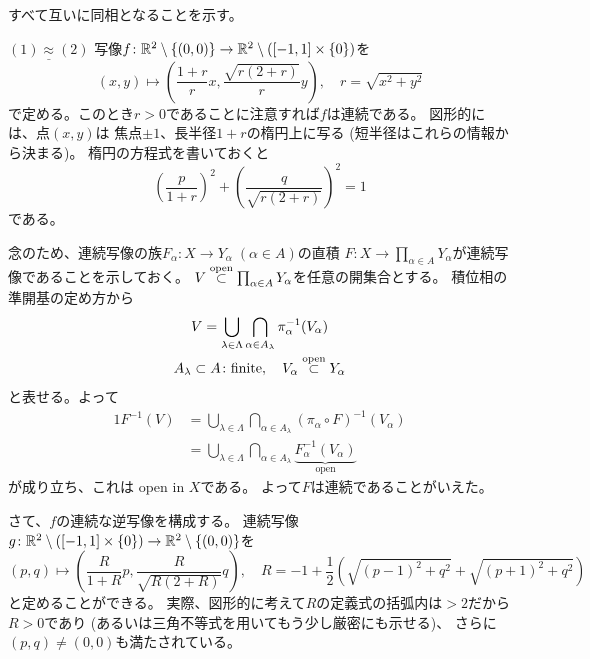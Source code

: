 \documentclass[report]{jlreq}
\begin{document}
\begin{answer}
    すべて互いに同相となることを示す。

    $\underline{(1) \approx (2)}$\quad
    写像$f \colon \mathbb{R}^2 \setminus \{(0, 0)\} \to \mathbb{R}^2 \setminus ([-1, 1] \times \{0\})$を
    \begin{equation}
        (x, y) \mapsto \left(\frac{1 + r}{r} x, \frac{\sqrt{r (2 + r)}}{r} y\right),
        \quad r = \sqrt{x^2 + y^2}
    \end{equation}
    で定める。このとき$r > 0$であることに注意すれば$f$は連続である。
    図形的には、点$(x, y)$は
    焦点$\pm 1$、長半径$1 + r$の楕円上に写る
    (短半径はこれらの情報から決まる)。
    楕円の方程式を書いておくと
    \begin{equation}
        \left(\frac{p}{1 + r}\right)^2 + \left(\frac{q}{\sqrt{r (2 + r)}}\right)^2 = 1
    \end{equation}
    である。

    念のため、連続写像の族$F_\alpha \colon X \to Y_\alpha\; (\alpha \in A)$の直積
    $F \colon X \to \prod_{\alpha \in A} Y_\alpha$が連続写像であることを示しておく。
    $V \stackrel{\text{open}}{\subset} \prod_{\alpha \in A} Y_\alpha$を任意の開集合とする。
    積位相の準開基の定め方から
    \begin{gather}
        V = \bigcup_{\lambda \in \Lambda}
            \bigcap_{\alpha \in A_\lambda}
            \pi_\alpha^{-1}(V_\alpha) \\
        A_\lambda \subset A \colon \text{finite}, \quad
        V_\alpha \stackrel{\text{open}}{\subset} Y_\alpha
    \end{gather}
    と表せる。よって
    \begin{alignat}{1}
        F^{-1}(V)
            &= \bigcup_{\lambda \in \Lambda}
                \bigcap_{\alpha \in A_\lambda}
                (\pi_\alpha \circ F)^{-1}(V_\alpha) \\
            &= \bigcup_{\lambda \in \Lambda}
                \bigcap_{\alpha \in A_\lambda}
                \underbrace{F_\alpha^{-1}(V_\alpha)}_{\text{open}}
    \end{alignat}
    が成り立ち、これは open in $X$である。
    よって$F$は連続であることがいえた。

    さて、$f$の連続な逆写像を構成する。
    連続写像$g \colon \mathbb{R}^2 \setminus ([-1, 1] \times \{0\}) \to \mathbb{R}^2 \setminus \{(0, 0)\}$を
    \begin{equation}
        (p, q) \mapsto \left(\frac{R}{1 + R} p, \frac{R}{\sqrt{R (2 + R)}} q\right),
        \quad R = -1 + \frac{1}{2}\left(
            \sqrt{(p - 1)^2 + q^2} + \sqrt{(p + 1)^2 + q^2}
        \right)
    \end{equation}
    と定めることができる。
    実際、図形的に考えて$R$の定義式の括弧内は$> 2$だから$R > 0$であり
    (あるいは三角不等式を用いてもう少し厳密にも示せる)、
    さらに$(p, q) \neq (0, 0)$も満たされている。


\end{answer}
\end{document}
